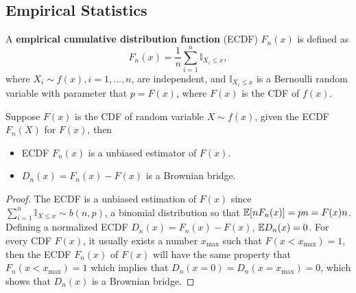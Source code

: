 \subsection{Empirical Statistics}

\begin{definition}
A \textbf{empirical cumulative distribution function} (ECDF) $F_n(x)$ is defined as
\begin{equation}
F_n(x)=\frac{1}{n}\sum_{i=1}^n\mathbb{I}_{X_i\le x},
\end{equation} 
where $X_i\sim f(x),i=1,\dots,n$, are independent, and $\mathbb{I}_{X_i\le x}$ is a Bernoulli random variable with parameter that $p=F(x)$, where $F(x)$ is the CDF of $f(x)$. 
\end{definition}

\begin{theorem}
Suppose $F(x)$ is the CDF of random variable $X\sim f(x)$, given the ECDF $F_n(X)$ for $F(x)$, then
\begin{itemize}
\item ECDF $F_n(x)$ is a unbiased estimator of $F(x)$.
\item $D_n(x)=F_n(x)-F(x)$ is a Brownian bridge.
\end{itemize}
\end{theorem}

\begin{proof}
The ECDF is a unbiased estimation of $F(x)$ since $\sum_{i=1}^n \mathbb{I}_{X\le x}\sim b(n,p)$, a binomial distribution so that $\mathbb{E}[nF_n(x)]=pn=F(x)n$. Defining a normalized ECDF $D_n(x)=F_n(x)-F(x)$, $\mathbb{E} D_n(x)=0$. For every CDF $F(x)$, it usually exists a number $x_{\text{max}}$ such that $F(x<x_{\text{max}})=1$, then the ECDF $F_n(x)$ of $F(x)$ will have the same property that $F_n(x<x_{\text{max}})=1$ which implies that $D_n(x=0)=D_n(x=x_{\text{max}})=0$, which shows that $D_n(x)$ is a Brownian bridge. 
\end{proof}